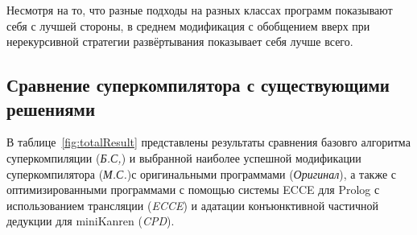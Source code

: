 % 

Несмотря на то, что разные подходы на разных классах программ показывают
себя с лучшей стороны, в среднем модификация с обобщением вверх при
нерекурсивной стратегии развёртывания показывает себя лучше всего.

\subsection{Сравнение суперкомпилятора с существующими решениями}

В таблице~\ref{fig:totalResult} представлены результаты сравнения базовго алгоритма
суперкомпиляции ({\it Б.С,}) и выбранной наиболее успешной модификации
суперкомпилятора ({\it М.С.})с оригинальными программами ({\it Оригинал}),
а также с оптимизированными программами с помощью
системы ECCE для Prolog с использованием трансляции ({\it ECCE}) и адатации
конъюнктивной частичной дедукции для miniKanren ({\it CPD}).

